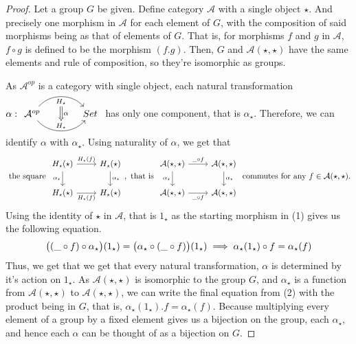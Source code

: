\documentclass[18pt,a4paper]{article}
\theoremstyle{definition}
\begin{document}
	\begin{proof} \setcounter{equation}{0} Let a group $G$ be given.
		Define category $\mathcal{A}$ with a single object $\star$. And precisely one morphism
		in $\mathcal{A} $ for each element of $G$, with the composition of said morphisms
		being as that of elements of $G$.
		That is, for morphisms $f$ and $g$ in $\mathcal{A}$, $f \circ g$ is defined to
		be the morphism $(f.g)$. Then, $G$ and $\mathcal{A}(\star, \star)$ have the
		same elements
		and rule of composition, so they're isomorphic as groups.

		As $\mathcal{A} ^{op}$ is a category with single object,
		 each natural transformation $\alpha:
		\begin{tikzcd}[row sep=small, column sep=large]
			\mathcal{A} ^{op} \arrow[r,bend left=50, "H_\star"{name=U, below}]
			\arrow[r, bend right = 50, "H_\star"{name=D, above}]
& Set
\arrow[Rightarrow, from=U , to=D, "\alpha"]
		\end{tikzcd}$
		has only one component, that is $\alpha_\star$. Therefore, we can
		identify $\alpha$ with $\alpha_\star$.
		Using naturality of $\alpha$, we get that
		\begin{equation}
			\text{ the square }
			\begin{tikzcd}
				H_\star(\star) \arrow[swap]{d}{\alpha_\star} \arrow{r}{H_\star(f)}
			& H_\star(\star) \arrow{d}{\alpha_\star}\\
			H_\star(\star) \arrow[swap]{r}{H_\star(f)}
			& H_\star(\star)
			\end{tikzcd}
			, \text{ that is }
			\begin{tikzcd}
				\mathcal{A} (\star,\star) \arrow[swap]{d}{\alpha_\star} \arrow{r}{\string _ \circ f}
			& \mathcal{A} (\star,\star) \arrow{d}{\alpha_\star}\\
			\mathcal{A} (\star,\star) \arrow[swap]{r}{ \string _ \circ f}
			& \mathcal{A} (\star,\star)
			\end{tikzcd}
			\text{ commutes for any } f \in \mathcal{A}(\star,\star).
		\end{equation}
		Using the identity of $\star$ in $\mathcal{A}$, that is $1_\star$ as the starting morphism
		in (1) gives us the following equation.
		\begin{equation}
			\big( (\string _ \circ f) \circ \alpha_\star \big)(1_\star) =
			\big(  \alpha_\star \circ (\string _ \circ f)\big)(1_\star)
			\implies \alpha_\star(1_\star) \circ f=\alpha_\star(f)
		\end{equation}
		Thus, we get that we get that every natural transformation,
		$\alpha$ is determined by it's action on $1_\star$.
		As $\mathcal{A} (\star, \star)$ is isomorphic to the group $G$, and
		$\alpha_\star$ is a function from $\mathcal{A} (\star,\star)$
		to $\mathcal{A} (\star,\star)$, we can write
		the final equation from (2) with the product being in $G$, that is,
		 $\alpha_\star(1_\star).f=\alpha_\star(f)$. Because
		multiplying every element of a group by a fixed element gives us a bijection on the
		group, each $\alpha_\star$, and hence each $\alpha$ can be thought of as a bijection on
		$G$.


\end{proof}
\end{document}
